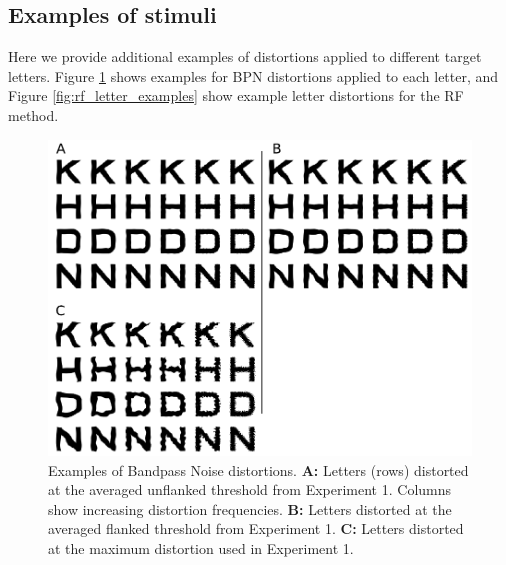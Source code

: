 \documentclass[doc, 11pt,a4paper,natbib]{apa6}\usepackage[]{graphicx}\usepackage[]{color}
\begin{document}
\subsection{Examples of stimuli}
\label{sec:stimulus_examples}

Here we provide additional examples of distortions applied to different target letters.
Figure \ref{fig:bpn_letter_examples} shows examples for BPN distortions applied to each letter, and Figure
\ref{fig:rf_letter_examples} show example letter distortions for the RF method.

\begin{figure}
	\centering
   \includegraphics[scale=1]{../figures/additional_letter_examples_BPN.pdf}
   \caption{
	Examples of Bandpass Noise distortions.
	\textbf{A:} Letters (rows) distorted at the averaged unflanked threshold from Experiment 1.
	Columns show increasing distortion frequencies.
	\textbf{B:} Letters distorted at the averaged flanked threshold from Experiment 1.
  \textbf{C:} Letters distorted at the maximum distortion used in Experiment 1.
   }
  \label{fig:bpn_letter_examples}
\end{figure}
\end{document}
